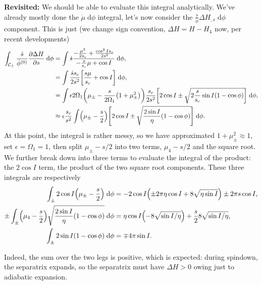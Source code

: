 \documentclass[11pt,
        usenames, %
        dvipsnames %
    ]{article}
\newcommand*{\pd}[2]{\frac{\partial#1}{\partial#2}}
\DeclarePairedDelimiter\p{\lparen}{\rparen}
\DeclarePairedDelimiter\s{\lbrack}{\rbrack}
\begin{document}
\textbf{Revisited:} We should be able to evaluate this integral analytically.
We've already mostly done the $\dot{\mu}\;\mathrm{d}\phi$ integral, let's now
consider the $\frac{\dot{s}}{\dot{\phi}}\Delta H_{,s}\;\mathrm{d}\phi$
component. This is just (we change sign convention, $\Delta H = H - H_4$ now,
per recent developments)
\begin{align*}
    \int_{\mathcal{C}_{\pm}} \frac{\dot{s}}{\dot{\phi}^{(0)}}
            \pd{\Delta H}{s}\;\mathrm{d}\phi &=
        \int \dot{s}\frac{-\frac{\mu^2}{2s_c} + \frac{\cos^2 Is_c}{2s^2}}{
            -\frac{s}{s_c}\mu + \cos I}\;\mathrm{d}\phi,\\
        &= \int \frac{\dot{s}s_c}{2s^2}\s*{\frac{s\mu}{s_c} + \cos
            I}\;\mathrm{d}\phi,\\
        &= \int \epsilon 2\Omega_1
            \p*{\mu_{\pm} - \frac{s}{2\Omega_1}\p*{1 + \mu_{\pm}^2}}
                \frac{s_c}{2s^2} \s*{
                    2\cos I \pm
                    \sqrt{2\frac{s}{s_c} \sin I\p*{1 - \cos \phi}}}
                \;\mathrm{d}\phi,\\
        &\approx \epsilon \frac{s_c}{s^2} \int
            \p*{\mu_{\pm} - \frac{s}{2}}
                \s*{2\cos I \pm \sqrt{\frac{2 \sin I}{\eta}\p*{1 - \cos \phi}}}
                \;\mathrm{d}\phi.
\end{align*}
At this point, the integral is rather messy, so we have approximated $1 +
\mu_{\pm}^2 \approx 1$, set $\epsilon = \Omega_1 = 1$, then split $\mu_{\pm} -
s/2$ into two terms, $\mu_4 - s/2$ and the square root. We further break down
into three terms to evaluate the integral of the product: the $2\cos I$ term,
the product of the two square root components. These three integrals are
respectively
\begin{align*}
    \int_{\pm} 2\cos I \p*{\mu_{\pm} - \frac{s}{2}}\;\mathrm{d}\phi &=
        -2\cos I\p*{\pm 2\pi \eta \cos I + 8\sqrt{\eta \sin I}}
        \pm 2\pi s\cos I,\\
    \pm \int_{\pm} \p*{\mu_4 - \frac{s}{2}}
            \sqrt{\frac{2\sin I}{\eta}\p*{1 - \cos \phi}} \;\mathrm{d}\phi &=
        \eta \cos I \p*{-8\sqrt{\sin I / \eta}}
            + \frac{s}{2}8\sqrt{\sin I/\eta} ,\\
    \int_{\pm} 2\sin I \p*{1 - \cos \phi}\;\mathrm{d}\phi &= \mp 4\pi \sin I.
\end{align*}

Indeed, the sum over the two legs is positive, which is expected: during
spindown, the separatrix expands, so the separatrix must have $\Delta H > 0$
owing just to adiabatic expansion.
\end{document}
